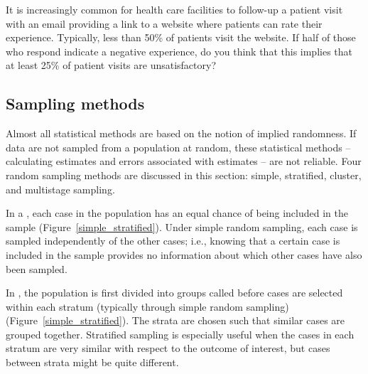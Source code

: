 \begin{exercisewrap}
\begin{nexercise}
It is increasingly common for health care facilities to follow-up a patient visit with an email providing a link to a website where patients can rate their experience.  Typically, less than 50\% of patients visit the website. If half of those who respond indicate a negative experience, do you think that this implies that at least 25\% of patient visits are unsatisfactory?\footnotemark{}
\end{nexercise}
\end{exercisewrap}



\textD{\newpage}


\subsection{Sampling methods}
\label{fourSamplingMethods}
\label{threeSamplingMethods}

Almost all statistical methods are based on the notion of implied randomness. If data are not sampled from a population at random, these statistical methods -- calculating estimates and errors associated with estimates -- are not reliable. Four random sampling methods are discussed in this section: simple, stratified, cluster, and multistage sampling.

In a , each case in the population has an equal chance of being included in the sample (Figure~\ref{simple_stratified}). Under simple random sampling, each case is sampled independently of the other cases; i.e., knowing that a certain case is included in the sample provides no information about which other cases have also been sampled. 

In , the population is first divided into groups called  before cases are selected within each stratum (typically through simple random sampling) (Figure~\ref{simple_stratified}). The strata are chosen such that similar cases are grouped together. Stratified sampling is especially useful when the cases in each stratum are very similar with respect to the outcome of interest, but cases between strata might be quite different. 

